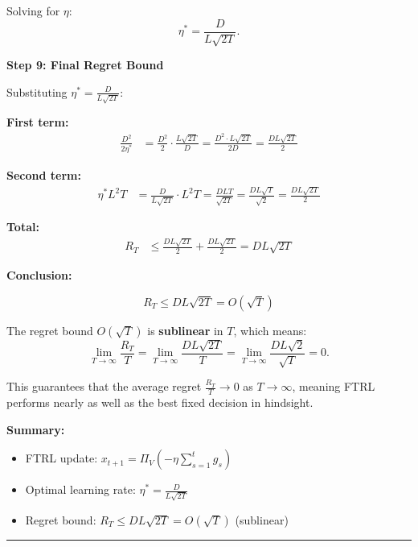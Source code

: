 \documentclass[12pt,letterpaper]{article}
\newenvironment{proof}{\noindent{\bf Proof:}}{\qed\bigskip}
\newcommand{\qed}{\rule{7pt}{7pt}}
\begin{document}
\begin{enumerate}
\begin{proof}
Solving for $\eta$:
\[
\eta^* = \frac{D}{L\sqrt{2T}}.
\]

\bigskip

\textbf{Step 9: Final Regret Bound}

Substituting $\eta^* = \frac{D}{L\sqrt{2T}}$:

\textbf{First term:}
\begin{align*}
\frac{D^2}{2\eta^*} &= \frac{D^2}{2} \cdot \frac{L\sqrt{2T}}{D} = \frac{D^2 \cdot L\sqrt{2T}}{2D} = \frac{DL\sqrt{2T}}{2}
\end{align*}

\textbf{Second term:}
\begin{align*}
\eta^* L^2 T &= \frac{D}{L\sqrt{2T}} \cdot L^2 T = \frac{DLT}{\sqrt{2T}} = \frac{DL\sqrt{T}}{\sqrt{2}} = \frac{DL\sqrt{2T}}{2}
\end{align*}

\textbf{Total:}
\begin{align*}
R_T &\leq \frac{DL\sqrt{2T}}{2} + \frac{DL\sqrt{2T}}{2} = DL\sqrt{2T}
\end{align*}

\bigskip

\textbf{Conclusion:}

\[
\boxed{R_T \leq DL\sqrt{2T} = O\left(\sqrt{T}\right)}
\]

The regret bound $O(\sqrt{T})$ is \textbf{sublinear} in $T$, which means:
\[
\lim_{T \to \infty} \frac{R_T}{T} = \lim_{T \to \infty} \frac{DL\sqrt{2T}}{T} = \lim_{T \to \infty} \frac{DL\sqrt{2}}{\sqrt{T}} = 0.
\]

This guarantees that the average regret $\frac{R_T}{T} \to 0$ as $T \to \infty$, meaning FTRL performs nearly as well as the best fixed decision in hindsight.

\bigskip

\textbf{Summary:}
\begin{itemize}
    \item FTRL update: $x_{t+1} = \Pi_V\left(-\eta\sum_{s=1}^{t}g_s\right)$
    \item Optimal learning rate: $\eta^* = \frac{D}{L\sqrt{2T}}$
    \item Regret bound: $R_T \leq DL\sqrt{2T} = O(\sqrt{T})$ (sublinear)
\end{itemize}

\end{proof}

\end{enumerate}
	
\end{document}
